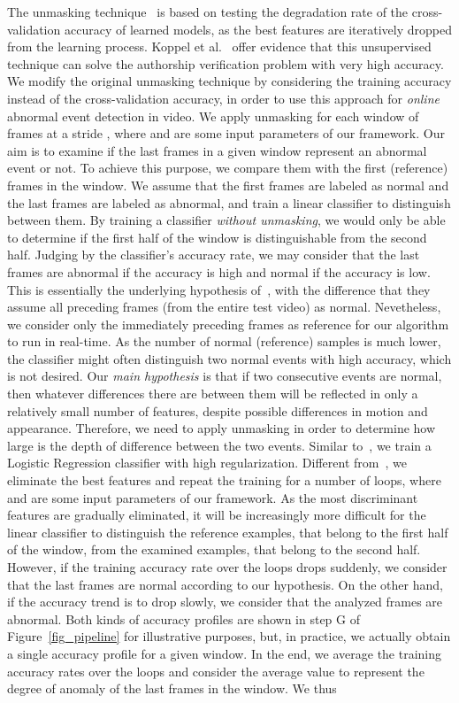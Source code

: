 \documentclass[10pt,twocolumn,letterpaper]{article}
\begin{document}
The unmasking technique~\cite{Koppel-JMLR-2007} is based on testing the degradation rate of the cross-validation accuracy of learned models, as the best features are iteratively dropped from the learning process. Koppel et al.~\cite{Koppel-JMLR-2007} offer evidence that this unsupervised technique can solve the authorship verification problem with very high accuracy. We modify the original unmasking technique by considering the training accuracy instead of the cross-validation accuracy, in order to use this approach for \emph{online} abnormal event detection in video. We apply unmasking for each window of  frames at a stride , where  and  are some input parameters of our framework. Our aim is to examine if the last  frames in a given window represent an abnormal event or not. To achieve this purpose, we compare them with the first  (reference) frames in the window. We assume that the first  frames are labeled as normal and the last  frames are labeled as abnormal, and train a linear classifier to distinguish between them. By training a classifier \emph{without unmasking}, we would only be able to determine if the first half of the window is distinguishable from the second half. Judging by the classifier's accuracy rate, we may consider that the last  frames are abnormal if the accuracy is high and normal if the accuracy is low. This is essentially the underlying hypothesis of~\cite{Giorno-ECCV-2016}, with the difference that they assume all preceding frames (from the entire test video) as normal. Nevetheless, we consider only the immediately preceding  frames as reference for our algorithm to run in real-time. As the number of normal (reference) samples is much lower, the classifier might often distinguish two normal events with high accuracy, which is not desired. Our \emph{main hypothesis} is that if two consecutive events are normal, then whatever differences there are between them will be reflected in only a relatively small number of features, despite possible differences in motion and appearance. Therefore, we need to apply unmasking in order to determine how large is the depth of difference between the two events. Similar to~\cite{Giorno-ECCV-2016}, we train a Logistic Regression classifier with high regularization. Different from~\cite{Giorno-ECCV-2016}, we eliminate the  best features and repeat the training for a number of  loops, where  and  are some input parameters of our framework. As the most discriminant features are gradually eliminated, it will be increasingly more difficult for the linear classifier to distinguish the reference examples, that belong to the first half of the window, from the examined examples, that belong to the second half. However, if the training accuracy rate over the  loops drops suddenly, we consider that the last  frames are normal according to our hypothesis. On the other hand, if the accuracy trend is to drop slowly, we consider that the analyzed frames are abnormal. Both kinds of accuracy profiles are shown in step G of Figure~\ref{fig_pipeline} for illustrative purposes, but, in practice, we actually obtain a single accuracy profile for a given window. In the end, we average the training accuracy rates over the  loops and consider the average value to represent the degree of anomaly of the last  frames in the window. We thus 
\end{document}
